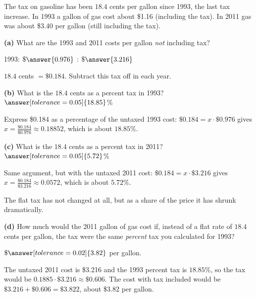 \documentclass[12pt]{ximera}
\begin{document}
\begin{problem}
The tax on gasoline has been $18.4$ cents per gallon since 1993, the last tax
increase. In 1993 a gallon of gas cost about \$1.16 (including the tax). In 2011 gas
was about \$3.40 per gallon (still including the tax).

\begin{prompt}
\textbf{(a)} What are the 1993 and 2011 costs per gallon \emph{not} including tax?

1993: $\$\answer{0.976}$ : $\$\answer{3.216}$

\begin{hint}
$18.4$ cents $= \$0.184$. Subtract this tax off in each year.
\end{hint}
\end{prompt}

\begin{prompt}
\textbf{(b)} What is the $18.4$ cents as a percent tax in 1993?
$\answer[tolerance=0.05]{18.85}$\%

\begin{solution}
Express \$0.184 as a percentage of the untaxed 1993 cost:
$\$0.184 = x \cdot \$0.976$ gives $x = \frac{\$0.184}{\$0.976} \approx 0.18852$,
which is about $18.85\%$.
\end{solution}
\end{prompt}

\begin{prompt}
\textbf{(c)} What is the $18.4$ cents as a percent tax in 2011?
$\answer[tolerance=0.05]{5.72}$\%

\begin{solution}
Same argument, but with the untaxed 2011 cost:
$\$0.184 = x \cdot \$3.216$ gives $x = \frac{\$0.184}{\$3.216} \approx 0.0572$,
which is about $5.72\%$.

The flat tax has not changed at all, but as a share of the price it has shrunk
dramatically.
\end{solution}
\end{prompt}

\begin{prompt}
\textbf{(d)} How much would the 2011 gallon of gas cost if, instead of a flat rate of
$18.4$ cents per gallon, the tax were the same \emph{percent} tax you calculated for
1993?

$\$\answer[tolerance=0.02]{3.82}$ per gallon.

\begin{solution}
The untaxed 2011 cost is \$3.216 and the 1993 percent tax is $18.85\%$, so the tax
would be $0.1885 \cdot \$3.216 \approx \$0.606$. The cost with tax included would be
$\$3.216 + \$0.606 = \$3.822$, about \$3.82 per gallon.
\end{solution}
\end{prompt}


\end{problem}
\end{document}
